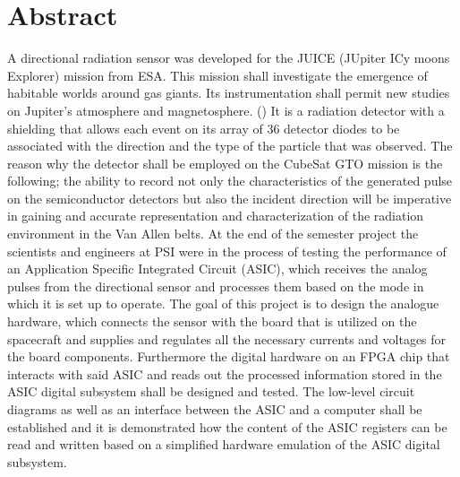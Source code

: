 \section{Abstract}
\label{sec:abstract}

A directional radiation sensor was developed for the JUICE (JUpiter ICy moons Explorer) mission from ESA. This mission shall investigate the emergence of habitable worlds around gas giants. Its instrumentation shall permit new studies on Jupiter's atmosphere and magnetosphere. (\cite{JUICE}) 
\newline
It is a radiation detector with a shielding that allows each event on its array of 36 detector diodes to be associated with the direction and the type of the particle that was observed. The reason why the detector shall be employed on the CubeSat GTO mission is the following; the ability to record not only the characteristics of the generated pulse on the semiconductor detectors but also the incident direction will be imperative in gaining and accurate representation and characterization of the radiation environment in the Van Allen belts.
\newline
At the end of the semester project the scientists and engineers at PSI were in the process of testing the performance of an Application Specific Integrated Circuit (ASIC), which receives the analog pulses from the directional sensor and processes them based on the mode in which it is set up to operate. The goal of this project is to design the analogue hardware, which connects the sensor with the board that is utilized on the spacecraft and supplies and regulates all the necessary currents and voltages for the board components. Furthermore the digital hardware on an FPGA chip that interacts with said ASIC and reads out the processed information stored in the ASIC digital subsystem shall be designed and tested. The low-level circuit diagrams as well as an interface between the ASIC and a computer shall be established and it is demonstrated how the content of the ASIC registers can be read and written based on a simplified hardware emulation of the ASIC digital subsystem.
